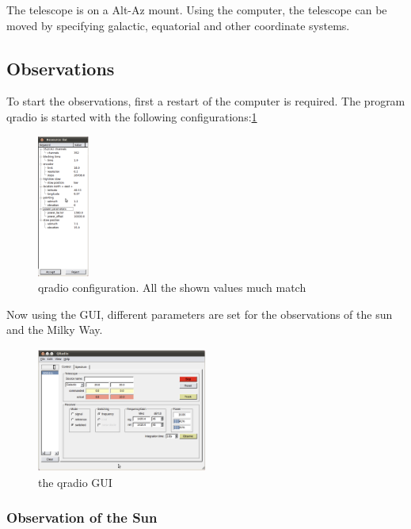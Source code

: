 \documentclass[12pt,a4paper]{article}
\begin{document}
        The telescope is on a Alt-Az mount. Using the computer, the telescope can be moved by specifying galactic, equatorial and other coordinate systems.
    \subsection{Observations}
            To start the observations, first a restart of the computer is required. The program qradio is started with the following configurations:\ref{fig:qradio_config}
            \begin{figure}[H]
                \centering
                \includegraphics[width=0.15\textwidth]{qradio_config.png}
                \caption{qradio configuration. All the shown values much match}
                \label{fig:qradio_config}
            \end{figure} 

            Now using the GUI, different parameters are set for the observations of the sun and the Milky Way.

            \begin{figure}[H]
                \centering
                \includegraphics[width=0.5\textwidth]{qradio_gui.png}
                \caption{the qradio GUI}
                \label{fig:qradio_gui}
            \end{figure}
        \subsubsection{Observation of the Sun}
\end{document}
